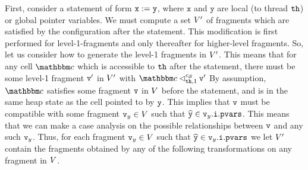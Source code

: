 First, consider a statement of form
${\tt x := y}$, where $\mathtt{x}$ and $\mathtt{y}$ are local
(to thread ${\tt th}$) or global pointer variables.
We must compute a set $V'$ of
fragments which are satisfied by the configuration after the statement.
This modification is first performed for
level-1-fragments and only thereafter for higher-level fragments.
So, let us consider how to generate the level-1 fragments in $V'$. This
means that for any cell $\cell$ which is accessible to ${\tt th}$ after
the statement, there must be some level-1 fragment $\mathtt{v}'$ in $V'$
with $\cell \lsatfrag{1}{\thread}{\sconf} \frag'$
By assumption, $\cell$ satisfies some fragment $\mathtt{v}$ in $V$
before the statement, and is in the same heap state as the cell pointed to by
$\mathtt{y}$.
This implies that $\mathtt{v}$ must be compatible with some
fragment $\mathtt{v}_y\in V$ such that $\widehat{\mathtt{y}} \in \mathtt{v}_y.\mathtt{i}.\mathtt{pvars}$. This means that we can make a case analysis on the possible relationships
between $\mathtt{v}$ and any such $\mathtt{v}_y$.
Thus, for each fragment $\mathtt{v}_y\in V$ such that
$\widehat{\mathtt{y}} \in \mathtt{v}_y.\mathtt{i}.\mathtt{pvars}$ we let $V'$ contain
the fragments obtained by any of the following transformations on any fragment in
$V$.
